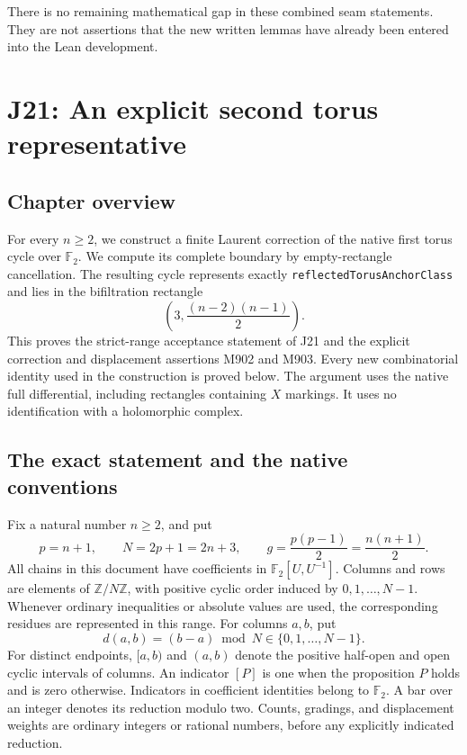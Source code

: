 \documentclass[11pt,oneside]{report}
\theoremstyle{definition}
\numberwithin{equation}{section}
\newcommand{\F}{\mathbb F_2}
\newcommand{\Z}{\mathbb Z}
\newcommand{\decl}[1]{\textnormal{\nolinkurl{#1}}}
\begin{document}
There is no remaining mathematical gap in these combined seam
statements. They are not assertions that the new written lemmas have
already been entered into the Lean development.


\chapter{J21: An explicit second torus representative}
\label{chapter:J21}



\section*{Chapter overview}
For every $n\geq2$, we construct a finite Laurent correction of the native
first torus cycle over $\mathbb F_2$. We compute its complete boundary by
empty-rectangle cancellation. The resulting cycle represents exactly
\decl{reflectedTorusAnchorClass} and lies in the bifiltration rectangle
\[
             \left(3,\frac{(n-2)(n-1)}2\right).
\]
This proves the strict-range acceptance statement of J21 and the explicit
correction and displacement assertions M902 and M903. Every new combinatorial
identity used in the construction is proved below. The argument uses the
native full differential, including rectangles containing $X$ markings.
It uses no identification with a holomorphic complex.




\section{The exact statement and the native conventions}
\label{J21:sec:torus-target}

Fix a natural number $n\geq2$, and put
\[
             p=n+1,\qquad N=2p+1=2n+3,\qquad
             g=\frac{p(p-1)}2=\frac{n(n+1)}2.
\]
All chains in this document have coefficients in $\F[U,U^{-1}]$.
Columns and rows are elements of $\Z/N\Z$, with positive cyclic order
induced by $0,1,\ldots,N-1$. Whenever ordinary inequalities or absolute
values are used, the corresponding residues are represented in this range.
For columns $a,b$, put
\[
 d(a,b)=(b-a)\bmod N\in\{0,1,\ldots,N-1\}.
\]
For distinct endpoints, $[a,b)$ and $(a,b)$ denote the positive half-open
and open cyclic intervals of columns. An indicator $[P]$ is one when
the proposition $P$ holds and is zero otherwise. Indicators in coefficient
identities belong to $\F$. A bar over an integer denotes its reduction
modulo two. Counts, gradings, and displacement weights are ordinary
integers or rational numbers, before any explicitly indicated reduction.
\end{document}
